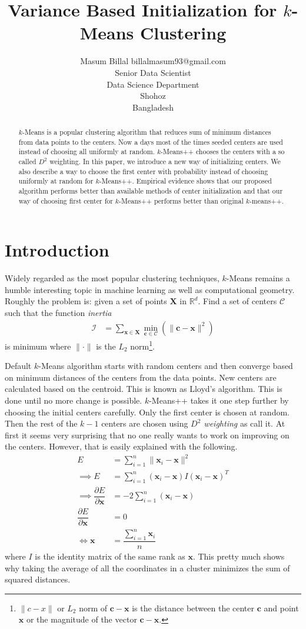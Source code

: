 \documentclass[twoside, 11pt]{article}
\title{Variance Based Initialization for $k$-Means Clustering}
\author{\name Masum Billal \email billalmasum93@gmail.com \\
	Senior Data Scientist\\
	\addr Data Science Department\\
	Shohoz\\
	Bangladesh}
\newcommand{\x}{\mathbf{x}}
\newcommand{\X}{\mathbf{X}}
\renewcommand{\c}{\mathbf{c}}
\newcommand{\C}{\mathcal{C}}
\begin{document}
	
	\maketitle
		\begin{abstract}%
			$k$-Means is a popular clustering algorithm that reduces sum of minimum distances from data points to the centers. Now a days most of the times seeded centers are used instead of choosing all uniformly at random. $k$-Means++ chooses the centers with a so called $D^2$ weighting. In this paper, we introduce a new way of initializing centers. We also describe a way to choose the first center with probability instead of choosing uniformly at random for $k$-Means++. Empirical evidence shows that our proposed algorithm performs better than available methods of center initialization and that our way of choosing first center for $k$-Means++ performs better than original $k$-means++.
		\end{abstract}
	\section{Introduction}
	Widely regarded as the most popular clustering techniques, $k$-Means remains a humble interesting topic in machine learning as well as computational geometry. Roughly the problem is: given a set of points $\X$ in $\mathbb{R}^d$. Find a set of centers $\mathcal{C}$ such that the function \textit{inertia}
		\begin{align*}
			\mathcal{I} & = \sum_{\x\in\X}\min_{\c\in\C}(\|\c-\x\|^2)
		\end{align*}
	is minimum where $\|\cdot\|$ is the $L_2$ norm\footnote{$\|c-x\|$ or $L_2$ norm of $\c-\x$ is the distance between the center $\c$ and point $\x$ or the magnitude of the vector $\c-\x$.}.
	
	Default $k$-Means algorithm starts with random centers and then converge based on minimum distances of the centers from the data points. New centers are calculated based on the centroid. This is known as Lloyd's algorithm\cite{lloyd}. This is done until no more change is possible. $k$-Means++ takes it one step further by choosing the initial centers carefully. Only the first center is chosen at random. Then the rest of the $k-1$ centers are chosen using \textit{$D^2$ weighting} as \cite{kmeans++} call it. At first it seems very surprising that no one really wants to work on improving on the centers. However, that is easily explained with the following.
		\begin{align*}
			E & = \sum_{i=1}^n\|\x_i-\x\|^2\\
			\implies E & = \sum_{i=1}^n(\x_i-\x)I(\x_i-\x)^{T}\\
			\implies \dfrac{\partial{E}}{\partial{\x}} & = -2\sum_{i=1}^n(\x_i-\x)\\
			\dfrac{\partial{E}}{\partial{\x}} & = 0\\
			\iff \x & = \dfrac{\sum_{i=1}^n\x_i}{n}
		\end{align*}
	where $I$ is the identity matrix of the same rank as $\x$. This pretty much shows why taking the average of all the coordinates in a cluster minimizes the sum of squared distances.
\end{document}
